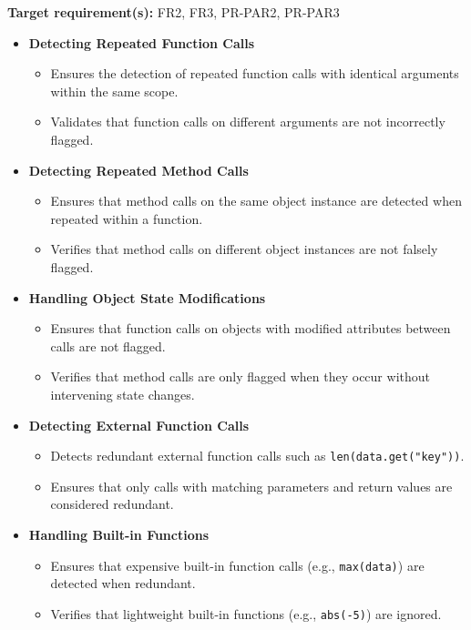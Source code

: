 \documentclass[12pt, titlepage]{article}
\begin{document}
\begin{enumerate}[label={\bf \textcolor{Maroon}{test-SRT-\arabic*}}, wide=0pt, font=\itshape]
\noindent \textbf{Target requirement(s):} FR2, FR3, PR-PAR2, PR-PAR3~\cite{SRS} \\

\begin{itemize}
    \item \textbf{Detecting Repeated Function Calls}
    \begin{itemize}
        \item Ensures the detection of repeated function calls with identical arguments within the same scope.
        \item Validates that function calls on different arguments are not incorrectly flagged.
    \end{itemize}

    \item \textbf{Detecting Repeated Method Calls}
    \begin{itemize}
        \item Ensures that method calls on the same object instance are detected when repeated within a function.
        \item Verifies that method calls on different object instances are not falsely flagged.
    \end{itemize}

    \item \textbf{Handling Object State Modifications}
    \begin{itemize}
        \item Ensures that function calls on objects with modified attributes between calls are not flagged.
        \item Verifies that method calls are only flagged when they occur without intervening state changes.
    \end{itemize}

    \item \textbf{Detecting External Function Calls}
    \begin{itemize}
        \item Detects redundant external function calls such as \texttt{len(data.get("key"))}.
        \item Ensures that only calls with matching parameters and return values are considered redundant.
    \end{itemize}

    \item \textbf{Handling Built-in Functions}
    \begin{itemize}
        \item Ensures that expensive built-in function calls (e.g., \texttt{max(data)}) are detected when redundant.
        \item Verifies that lightweight built-in functions (e.g., \texttt{abs(-5)}) are ignored.
    \end{itemize}


\end{itemize}
\end{enumerate}
\end{document}
